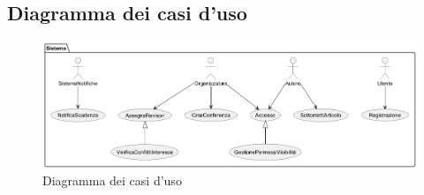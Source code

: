 \subsection{Diagramma dei casi d'uso}
\label{sec:diagramma_casi_uso}
\begin{figure}[!ht]
  \centering
  \includegraphics[width=\linewidth]{./VisualParadigm/diagramma_uso.png}
  \caption{Diagramma dei casi d'uso}
  \label{fig:diagramma_uso}
\end{figure}

